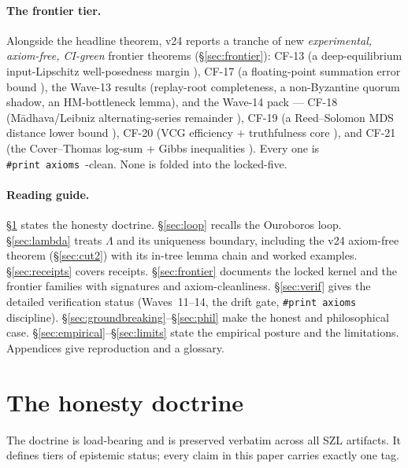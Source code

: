 \documentclass[11pt]{article}
\theoremstyle{plain}
\theoremstyle{definition}
\theoremstyle{remark}
\newcommand{\La}{\Lambda}
\newcommand{\leantext}[1]{\texttt{\def\_{\char`\_\penalty0\hskip0pt\relax}#1}}
\newcommand{\lean}[1]{\ifmmode\text{\leantext{#1}}\else\leantext{#1}\fi}
\newcommand{\printax}[1]{\lean{\#print~axioms~#1}}
\begin{document}
\paragraph{The frontier tier.}
Alongside the headline theorem, v24 reports a tranche of new
\emph{experimental, axiom-free, CI-green} frontier theorems (\S\ref{sec:frontier}):
CF-13 (a deep-equilibrium input-Lipschitz well-posedness margin
\cite{baikolter2019}), CF-17 (a floating-point summation error bound
\cite{higham2002}), the Wave-13 results (replay-root completeness, a
non-Byzantine quorum shadow, an HM-bottleneck lemma), and the Wave-14 pack ---
CF-18 (M\=adhava/Leibniz alternating-series remainder \cite{plofker2009}),
CF-19 (a Reed--Solomon MDS distance lower bound \cite{reedsolomon1960,singleton1964}),
CF-20 (VCG efficiency $+$ truthfulness core \cite{vickrey1961,clarke1971,groves1973,nisan2007}),
and CF-21 (the Cover--Thomas log-sum $+$ Gibbs inequalities \cite{coverthomas2006}).
Every one is \printax{}-clean. None is folded into the locked-five.

\paragraph{Reading guide.}
\S\ref{sec:doctrine} states the honesty doctrine. \S\ref{sec:loop} recalls the
Ouroboros loop. \S\ref{sec:lambda} treats $\La$ and its uniqueness boundary,
including the v24 axiom-free theorem (\S\ref{sec:cut2}) with its in-tree lemma
chain and worked examples. \S\ref{sec:receipts} covers receipts.
\S\ref{sec:frontier} documents the locked kernel and the frontier families with
signatures and axiom-cleanliness. \S\ref{sec:verif} gives the detailed
verification status (Waves~11--14, the drift gate, \texttt{\#print axioms}
discipline). \S\ref{sec:groundbreaking}--\S\ref{sec:phil} make the honest and
philosophical case. \S\ref{sec:empirical}--\S\ref{sec:limits} state the empirical
posture and the limitations. Appendices give reproduction and a glossary.

\section{The honesty doctrine}
\label{sec:doctrine}

The doctrine is load-bearing and is preserved verbatim across all SZL artifacts.
It defines tiers of epistemic status; every claim in this paper carries exactly
one tag.
\end{document}
